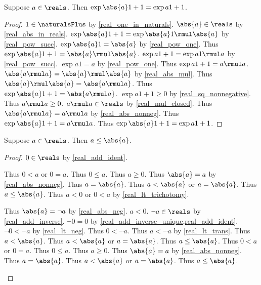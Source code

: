 \begin{theorem}\label{real_abs_square}
    Suppose $a\in\reals$.
    Then $\exp{\abs{a}}{1+1} = \exp{a}{1+1}$.
\end{theorem}
\begin{proof}
    $1\in\naturalsPlus$ by \cref{real_one_in_naturals}.
    $\abs{a}\in\reals$ by \cref{real_abs_in_reals}.
    $\exp{\abs{a}}{1+1} = \exp{\abs{a}}{1} \rmul \abs{a}$ by \cref{real_pow_succ}.
    $\exp{\abs{a}}{1} = \abs{a}$ by \cref{real_pow_one}.
    Thus $\exp{\abs{a}}{1+1} = \abs{a} \rmul \abs{a}$.
    $\exp{a}{1+1} = \exp{a}{1} \rmul a$ by \cref{real_pow_succ}.
    $\exp{a}{1} = a$ by \cref{real_pow_one}.
    Thus $\exp{a}{1+1} = a \rmul a$.
    $\abs{a \rmul a} = \abs{a} \rmul \abs{a}$ by \cref{real_abs_mul}.
    Thus $\abs{a} \rmul \abs{a} = \abs{a \rmul a}$.
    Thus $\exp{\abs{a}}{1+1} = \abs{a \rmul a}$.
    $\exp{a}{1+1} \geq 0$ by \cref{real_sq_nonnegative}.
    Thus $a \rmul a \geq 0$.
    $a \rmul a\in\reals$ by \cref{real_mul_closed}.
    Thus $\abs{a \rmul a} = a \rmul a$ by \cref{real_abs_nonneg}.
    Thus $\exp{\abs{a}}{1+1} = a \rmul a$.
    Thus $\exp{\abs{a}}{1+1} = \exp{a}{1+1}$.
\end{proof}

\begin{theorem}\label{real_leq_abs}
    Suppose $a\in\reals$.
    Then $a \leq \abs{a}$.
\end{theorem}
\begin{proof}
    $0\in\reals$ by \cref{real_add_ident}.
    \begin{byCase}
        Thus $0 < a$ or $0 = a$.
        Thus $0 \leq a$.
        Thus $a \geq 0$.
        Thus $\abs{a} = a$ by \cref{real_abs_nonneg}.
        Thus $a = \abs{a}$.
        Thus $a < \abs{a}$ or $a = \abs{a}$.
        Thus $a \leq \abs{a}$.
        Thus $a < 0$ or $0 < a$ by \cref{real_lt_trichotomy}.
        \begin{byCase}
            Thus $\abs{a} = \neg{a}$ by \cref{real_abs_neg}.
            $a < 0$.
            $\neg{a}\in\reals$ by \cref{real_add_inverse}.
            $\neg{0} = 0$ by \cref{real_add_inverse_unique,real_add_ident}.
            $\neg{0} < \neg{a}$ by \cref{real_lt_neg}.
            Thus $0 < \neg{a}$.
            Thus $a < \neg{a}$ by \cref{real_lt_trans}.
            Thus $a < \abs{a}$.
            Thus $a < \abs{a}$ or $a = \abs{a}$.
            Thus $a \leq \abs{a}$.
            Thus $0 < a$ or $0 = a$.
            Thus $0 \leq a$.
            Thus $a \geq 0$.
            Thus $\abs{a} = a$ by \cref{real_abs_nonneg}.
            Thus $a = \abs{a}$.
            Thus $a < \abs{a}$ or $a = \abs{a}$.
            Thus $a \leq \abs{a}$.
        \end{byCase}
    \end{byCase}
\end{proof}

